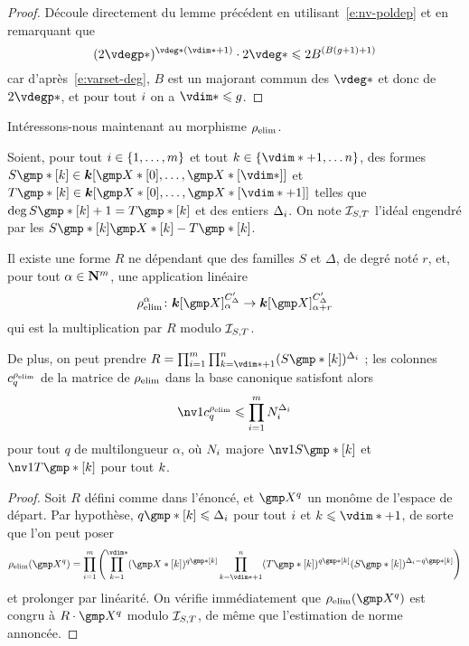 \begin{proof}
  Découle directement du lemme précédent en utilisant~\eqref{e:nv-poldep} et
  en remarquant que
  \begin{equation}
    ( 2 \vdegp* )^{\vdeg* (\vdim* + 1)} \cdot 2 \vdeg*
    \le
    2 B^{(B(\genre+1) + 1)}
  \end{equation}
  car d'après~\eqref{e:varset-deg}, \( B \) est un majorant commun des \(
    \vdeg* \) et donc de \( 2\vdegp* \), et pour tout \( i \) on a \(
    \vdim* \le \genre \).
\end{proof}

Intéressons-nous maintenant au morphisme \( \rho\sb{\mathrm{elim}} \).

\begin{lem}
  Soient, pour tout \( i \in \{ 1, \dots, m \} \) et tout \( \ind \in
  \{ \vdim* + 1, \dots \dimp \} \), des formes
  \( S\mexp*[\ind] \in \cdn [ \vmp*[0], \dots, \vmp*[\vdim*] ] \) et
  \( T\mexp*[\ind] \in \cdn [ \vmp*[0], \dots, \vmp*[\vdim*+1] ] \)
  telles que \( \deg S\mexp*[\ind] + 1 = T\mexp*[\ind] \) et des entiers
  \( \Delta_i \). On note \( \mathcal I_{S, T} \) l'idéal engendré par les
  \( S\mexp*[\ind] \vmp*[\ind] - T\mexp*[\ind] \).

  Il existe une forme \( R \) ne dépendant que des familles \( S \) et \(
    \Delta \), de degré noté \( r \), et, pour tout \( \alpha \in {\mathbf{N}}^m \),
  une application linéaire
  \begin{equation}
    \relim^\alpha \colon
    \cdn [\vmp]_ {\alpha}^{C'_\Delta}
    \to
    \cdn [\vmp]_ {\alpha+r}^{C'_\Delta}
  \end{equation}
  qui est la multiplication par \( R \) modulo \( \mathcal I_{S, T} \).

  De plus, on peut prendre
  \( R = \prod\fctrange \prod_{\ind = \vdim*+1}^{\dimp}
    ( S\mexp*[\ind] )^{\Delta_\fct} \) ; les colonnes \( c_q^{\rho\sb{\mathrm{elim}}} \) de la
  matrice de \( \rho\sb{\mathrm{elim}} \) dans la base canonique satisfont alors
  \begin{equation}
    \nv1{ c_q^{\relim} }
    \le
    \prod\fctrange N_\fct^{\Delta_\fct}
  \end{equation}
  pour tout \( q \) de multilongueur \( \alpha \), où \( N_i \) majore
  \( \nv1{ S\mexp*[\ind] } \) et \( \nv1{ T\mexp*[\ind] } \) pour tout
  \( k \).
\end{lem}

\begin{proof}
  Soit \( R \) défini comme dans l'énoncé, et \( \vmp^q \) un monôme de
  l'espace de départ. Par hypothèse, \( q\mexp*[\ind] \le \Delta_\fct \) pour
  tout \( i \) et \( \ind \le \vdim* + 1 \), de sorte que l'on peut poser
  \begin{equation}
    \relim( \vmp^q )
    =
    \prod\fctrange \left(
    \prod_{\ind=1}^{\vdim*}
    (\vmp*[\ind])^{q\mexp*[\ind]}
    \prod_{\ind=\vdim*+1}^\dimp
    (T\mexp*[\ind])^{q\mexp*[\ind]}
    (S\mexp*[\ind])^{\Delta_\fct - q\mexp*[\ind]}
    \right)
  \end{equation}
  et prolonger par linéarité. On vérifie immédiatement que \( \relim(\vmp^q)
  \) est congru à \( R \cdot \vmp^q \) modulo \( \mathcal I_{S, T} \), de même
  que l'estimation de norme annoncée.
\end{proof}

